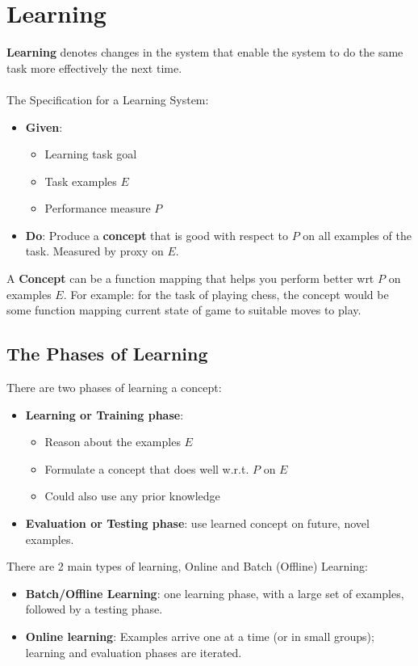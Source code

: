 \documentclass[12pt, a4paper]{book}
\begin{document}
\section{Learning}
\textbf{Learning} denotes changes in the system that enable the system to do the same task more effectively the next time.\\\\
The Specification for a Learning System:
\begin{itemize}
    \item \textbf{Given}: 
    \begin{itemize}
        \item Learning task goal
        \item Task examples $E$
        \item Performance measure $P$
    \end{itemize} 

\item \textbf{Do}: Produce a \textbf{concept} that is good with
respect to $P$ on all examples of the task. Measured by proxy on $E$.\\
\end{itemize}
A \textbf{Concept} can be a function mapping that helps you perform better wrt $P$ on examples $E$. For example: for the task of playing chess, the concept would be some function mapping current state of game to suitable moves to play.

\subsection{The Phases of Learning}
There are two phases of learning a concept:
\begin{itemize}
    \item \textbf{Learning or Training phase}:
    \begin{itemize}
        \item Reason about the examples $E$
        \item Formulate a concept that does well w.r.t. $P$ on $E$
        \item Could also use any prior knowledge
    \end{itemize}
    \item \textbf{Evaluation or Testing phase}: use learned concept on future, novel examples.\\
\end{itemize}
There are 2 main types of learning, Online and Batch (Offline) Learning:
\begin{itemize}
    \item \textbf{Batch/Offline Learning}: one learning phase,
with a large set of examples, followed by a
testing phase.
    \item \textbf{Online learning}: Examples arrive one at a time
(or in small groups); learning and evaluation
phases are iterated.\\
\end{itemize}
\end{document}
